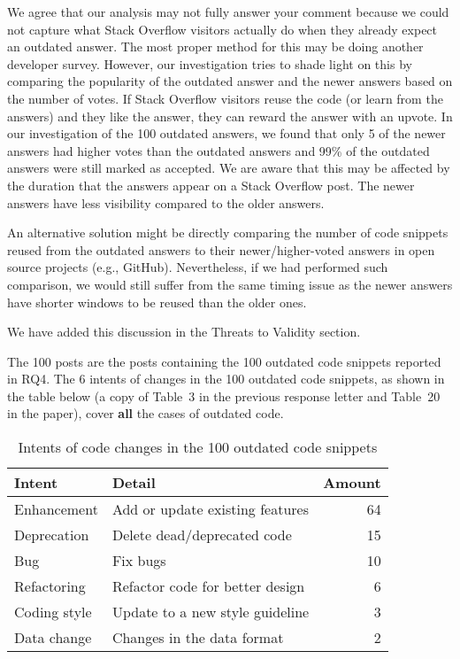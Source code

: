 \documentclass[a4paper,twoside,10pt]{reviewresponse}
\begin{document}
We agree that our analysis may not fully answer your comment because we could not capture what Stack Overflow visitors actually do when they already expect an outdated answer. The most proper method for this may be doing another developer survey. However, our investigation tries to shade light on this by comparing the popularity of the outdated answer and the newer answers based on the number of votes. If Stack Overflow visitors reuse the code (or learn from the answers) and they like the answer, they can reward the answer with an upvote. In our investigation of the 100 outdated answers, we found that only 5 of the newer answers had higher votes than the outdated answers and 99\% of the outdated answers were still marked as accepted. We are aware that this may be affected by the duration that the answers appear on a Stack Overflow post. The newer answers have less visibility compared to the older answers. 

An alternative solution might be directly comparing the number of code snippets reused from the outdated answers to their newer/higher-voted answers in open source projects (e.g., GitHub). 
Nevertheless, if we had performed such comparison, we would still suffer from the same timing issue as the newer answers have shorter windows to be reused than the older ones.

We have added this discussion in the Threats to Validity section.


The 100 posts are the posts containing the 100 outdated code snippets reported in RQ4. The 6 intents of changes in the 100 outdated code snippets, as shown in the table below (a copy of Table~3 in the previous response letter and Table~20 in the paper), cover \textbf{all} the cases of outdated code. 

\begin{table}[H]
	\centering
	\begin{tabular}{llr}
		\toprule
		Intent & Detail & Amount \\
		\midrule
		Enhancement & Add or update existing features & 64 \\
		Deprecation & Delete dead/deprecated code & 15 \\
		Bug & Fix bugs & 10 \\
		Refactoring & Refactor code for better design & 6 \\
		Coding style & Update to a new style guideline & 3 \\
		Data change & Changes in the data format & 2 \\
		\bottomrule
	\end{tabular}
	\label{tab:intent_outdated}
	\caption{Intents of code changes in the 100 outdated code snippets}
\end{table}
\end{document}
